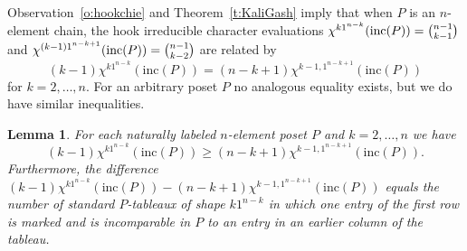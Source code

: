 \documentclass[12pt]{amsart}
\newtheorem{lem}[thm]{Lemma}
\numberwithin{equation}{section}
\newcommand{\inc}{\mathrm{inc}}
\begin{document}
Observation~\ref{o:hookchie} and Theorem~\ref{t:KaliGash}
imply
that when $P$ is an $n$-element chain, the hook irreducible
character evaluations
$\chi^{k1^{n-k}}(\inc(P)) = \tbinom{n-1}{k-1}$
and $\chi^{(k-1)1^{n-k+1}}(\inc(P)) = \tbinom{n-1}{k-2}$
are related by
\begin{equation}\label{eq:hookchareqs}
  (k-1) \chi^{k1^{n-k}}(\inc(P)) = (n-k+1) \chi^{k-1,1^{n-k+1}}(\inc(P))
\end{equation}
for $k = 2,\dotsc,n$.
For an arbitrary poset $P$ no analogous equality
exists, but we do have similar
inequalities.
\begin{lem}\label{l:hookineq}
  For each naturally labeled $n$-element poset $P$ and $k = 2,\dotsc,n$
  we have
  \begin{equation}\label{eq:binomapprox}
    (k-1) \chi^{k1^{n-k}}(\inc(P)) \geq (n-k+1) \chi^{k-1,1^{n-k+1}}(\inc(P)).
  \end{equation}
  Furthermore, the difference
   $(k-1) \chi^{k1^{n-k}}(\inc(P)) - (n-k+1) \chi^{k-1,1^{n-k+1}}(\inc(P))$
  equals the number of standard $P$-tableaux
  of shape $k1^{n-k}$ in which one entry of the first row is marked
  and is incomparable in $P$ to an entry in an earlier column of the tableau.
\end{lem}
\end{document}
